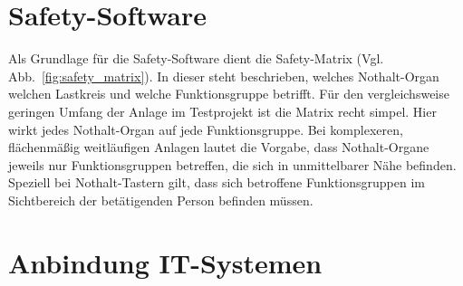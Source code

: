 

\section{Safety-Software}
\label{sec:safety_software}

Als Grundlage für die Safety-Software dient die Safety-Matrix (Vgl. Abb.~\ref{fig:safety_matrix}). In dieser steht beschrieben, welches Nothalt-Organ welchen Lastkreis und welche Funktionsgruppe betrifft. Für den vergleichsweise geringen Umfang der Anlage im Testprojekt ist die Matrix recht simpel. Hier wirkt jedes Nothalt-Organ auf jede Funktionsgruppe. Bei komplexeren, flächenmäßig weitläufigen Anlagen lautet die Vorgabe, dass Nothalt-Organe jeweils nur Funktionsgruppen betreffen, die sich in unmittelbarer Nähe befinden. Speziell bei Nothalt-Tastern gilt, dass sich betroffene Funktionsgruppen im Sichtbereich der betätigenden Person befinden müssen.


\section{Anbindung IT-Systemen}
